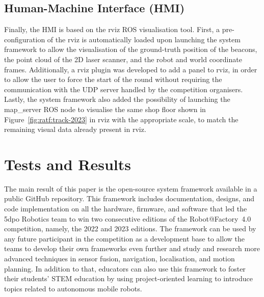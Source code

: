 \documentclass[conference]{IEEEtran}
\begin{document}
\subsection{Human-Machine Interface (HMI)}

Finally, the HMI is based on the rviz ROS visualisation tool.
First, a pre-configuration of the rviz is automatically loaded upon launching the system framework to allow the visualisation of the
ground-truth position of the beacons,
the point cloud of the 2D laser scanner,
and the robot and world coordinate frames.
Additionally, a rviz plugin was developed to add a panel to rviz, in order to allow the user to force the start of the round without requiring the communication with the UDP server handled by the competition organisers.
Lastly, the system framework also added the possibility of launching the map\_server ROS node to visualise the same shop floor shown in Figure~\ref{fig:ratf:track-2023} in rviz with the appropriate scale, to match the remaining visual data already present in rviz.





\section{Tests and Results}\label{sec:tests}

The main result of this paper is the open-source system framework available in a public GitHub repository.
This framework includes documentation, designs, and code implementation on all the hardware, firmware, and software that led the 5dpo Robotics team to win two consecutive editions of the Robot@Factory~4.0 competition, namely, the 2022 and 2023 editions.
The framework can be used by any future participant in the competition as a development base to allow the teams to develop their own frameworks even further and study and research more advanced techniques in sensor fusion, navigation, localisation, and motion planning.
In addition to that, educators can also use this framework to foster their students' STEM education by using project-oriented learning to introduce topics related to autonomous mobile robots.
\end{document}

